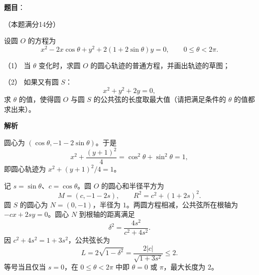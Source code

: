 \begin{answer}

\textbf{题目}：

（本题满分14分）

设圆 $O$ 的方程为
\nopagebreak[4]
\[
x^2-2x\cos\theta+y^2+2(1+2\sin\theta)y=0,
\qquad 0\le\theta<2\pi.
\]

（1） 当 $\theta$ 变化时，求圆 $O$ 的圆心轨迹的普通方程，并画出轨迹的草图；

（2） 如果又有圆 $S$：
\nopagebreak[4]
\[
x^2+y^2+2y=0,
\]
求 $\theta$ 的值，使得圆 $O$ 与圆 $S$ 的公共弦的长度取最大值（请把满足条件的 $\theta$ 的值都求出来）。

\textbf{解析}


圆心为 $(\cos\theta,-1-2\sin\theta)$。于是
\nopagebreak[4]
\[
x^2+\frac{(y+1)^2}{4}
=\cos^2\theta+\sin^2\theta=1,
\]
即圆心轨迹为 $x^2+(y+1)^2/4=1$。


记 $s=\sin\theta$、$c=\cos\theta$。圆 $O$ 的圆心和半径平方为
\nopagebreak[4]
\[
M=(c,-1-2s),\qquad R^2=c^2+(1+2s)^2.
\]
圆 $S$ 的圆心为 $N=(0,-1)$，半径为 $1$。两圆方程相减，公共弦所在根轴为 $-cx+2sy=0$。圆心 $N$ 到根轴的距离满足
\nopagebreak[4]
\[
\delta^2=\frac{4s^2}{c^2+4s^2}.
\]
因 $c^2+4s^2=1+3s^2$，公共弦长为
\nopagebreak[4]
\[
L=2\sqrt{1-\delta^2}
=\frac{2|c|}{\sqrt{1+3s^2}}\le2.
\]
等号当且仅当 $s=0$，在 $0\le\theta<2\pi$ 中即 $\theta=0$ 或 $\pi$，最大长度为 $2$。



\end{answer}